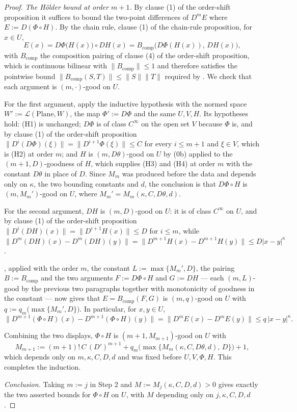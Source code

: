 \begin{proof}
\emph{The H\"older bound at order $m+1$.}  By clause (1) of the order-shift proposition it
suffices to bound the two-point differences of $D^{m}E$ where
$E:=D(\Phi\circ H)$.  By the chain rule, clause (1) of the chain-rule proposition, for
$x\in U$,
\[
  E(x)=D\Phi\bigl(H(x)\bigr)\circ DH(x)=B_{\mathrm{comp}}\bigl(D\Phi(H(x)),\,DH(x)\bigr),
\]
with $B_{\mathrm{comp}}$ the composition pairing of clause (4) of the order-shift proposition,
which is continuous bilinear with $\lVert B_{\mathrm{comp}}\rVert\le1$ and therefore satisfies
the pointwise bound
$\lVert B_{\mathrm{comp}}(S,T)\rVert\le\lVert S\rVert\lVert T\rVert$ required by
.  We check that each argument is $(m,\cdot)$-good on $U$.

For the first argument, apply the inductive hypothesis with the normed space
$W':=\mathcal{L}(\mathrm{Plane},W)$, the map $\Phi':=D\Phi$ and the same $U,V,H$.  Its
hypotheses hold: (H1) is unchanged; $D\Phi$ is of class $C^{\infty}$ on the open set $V$
because $\Phi$ is, and by clause (1) of the order-shift proposition
$\lVert D^{i}(D\Phi)(\xi)\rVert=\lVert D^{i+1}\Phi(\xi)\rVert\le C$ for every $i\le m+1$ and
$\xi\in V$, which is (H2) at order $m$; and $H$ is $(m,D\theta)$-good on $U$ by (0b) applied to
the $(m+1,D)$-goodness of $H$, which supplies (H3) and (H4) at order $m$ with the constant
$D\theta$ in place of $D$.  Since $M_m$ was produced before the data and depends only on
$\kappa$, the two bounding constants and $d$, the conclusion is that
$D\Phi\circ H$ is $(m,M_m')$-good on $U$, where $M_m'=M_m(\kappa,C,D\theta,d)$.

For the second argument, $DH$ is $(m,D)$-good on $U$: it is of class $C^{\infty}$ on $U$, and by
clause (1) of the order-shift proposition $\lVert D^{i}(DH)(x)\rVert=\lVert D^{i+1}H(x)\rVert\le
D$ for $i\le m$, while
$\lVert D^{m}(DH)(x)-D^{m}(DH)(y)\rVert=\lVert D^{m+1}H(x)-D^{m+1}H(y)\rVert
 \le D\lvert x-y\rvert^{\kappa}$.

, applied with the order $m$, the constant
$L:=\max\{M_m',D\}$, the pairing $B:=B_{\mathrm{comp}}$ and the two arguments
$F:=D\Phi\circ H$ and $G:=DH$ --- each $(m,L)$-good by the previous two paragraphs together with
monotonicity of goodness in the constant --- now gives that $E=B_{\mathrm{comp}}(F,G)$ is
$(m,q)$-good on $U$ with $q:=q_m\bigl(\max\{M_m',D\}\bigr)$.  In particular, for $x,y\in U$,
\[
  \bigl\lVert D^{m+1}(\Phi\circ H)(x)-D^{m+1}(\Phi\circ H)(y)\bigr\rVert
  =\bigl\lVert D^{m}E(x)-D^{m}E(y)\bigr\rVert\le q\,\lvert x-y\rvert^{\kappa}.
\]

Combining the two displays, $\Phi\circ H$ is $(m+1,M_{m+1})$-good on $U$ with
\[
  M_{m+1}:=(m+1)!\,C\,(D')^{m+1}
    +q_m\bigl(\max\{M_m(\kappa,C,D\theta,d),\,D\}\bigr)+1,
\]
which depends only on $m,\kappa,C,D,d$ and was fixed before $U,V,\Phi,H$.  This completes the
induction.

\medskip\noindent\emph{Conclusion.}  Taking $m:=j$ in Step 2 and $M:=M_j(\kappa,C,D,d)>0$
gives exactly the two asserted bounds for $\Phi\circ H$ on $U$, with $M$ depending only on
$j,\kappa,C,D,d$.
\end{proof}
